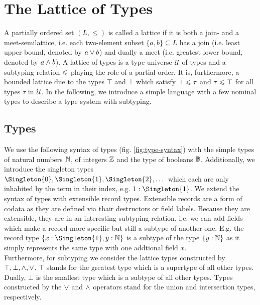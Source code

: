\chapter{The Lattice of Types}
\label{ch:lattice}

A partially ordered set $(L , \leq)$ is called a lattice if it is both a join- and a meet-semilattice, i.e. each two-element subset $\{a,b\}\subseteq L$ has a join (i.e. least upper bound, denoted by $a \vee b$) and dually a meet (i.e. greatest lower bound, denoted by $a \wedge b$).
A lattice of types is a type universe $\mathcal{U}$ of types and a subtyping relation $\leqslant$ playing the role of a partial order.
It is, furthermore, a bounded lattice due to the types $\top$ and $\bot$ which satisfy $\bot \leqslant \tau$ and $\tau \leqslant \top$ for all types $\tau$ in $\mathcal{U}$.
In the following, we introduce a simple language with a few nominal types to describe a type system with subtyping.

\section{Types}
\label{sec:types}

We use the following syntax of types (fig. \ref{fig:type-syntax}) with the simple types of natural numbers $\mathbb{N}$, of integers $\mathbb{Z}$ and the type of booleans $\mathbb{B}$.
Additionally, we introduce the singleton types $\Singleton{0}, \Singleton{1}, \Singleton{2}, \dots$ which each are only inhabited by the term in their index, e.g. $1 : \Singleton{1}$.
We extend the syntax of types with extensible record types. \cite{leijen2005extensible}
Extensible records are a form of codata as they are defined via thair destructors or field labels.
Because they are extensible, they are in an interesting subtyping relation, i.e. we can add fields which make a record more specific but still a subtype of another one.
E.g. the record type $\{ x : \Singleton{1}, y : \Nat \}$ is a subtype of the type $\{ y : \mathbb{N} \}$ as it simply represents the same type with one addtional field $x$. \\
Furthermore, for subtyping we consider the lattice types constructed by $\top, \bot, \wedge, \vee$.
$\top$ stands for the greatest type which is a supertype of all other types.
Dually, $\bot$ is the smallest type which is a subtype of all other types.
Types constructed by the $\vee$ and $\wedge$ operators stand for the union and intersection types, respectively.

